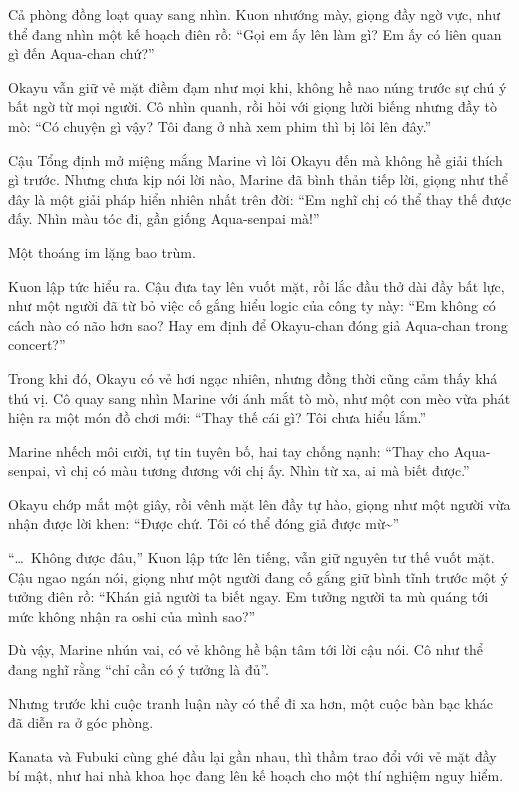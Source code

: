\documentclass[../main.tex]{subfiles}
\begin{document}

Cả phòng đồng loạt quay sang nhìn. Kuon nhướng mày, giọng đầy ngờ vực, như thể đang nhìn một kế hoạch điên rồ: ``Gọi em ấy lên làm gì? Em ấy có liên quan gì đến Aqua-chan chứ?''

Okayu vẫn giữ vẻ mặt điềm đạm như mọi khi, không hề nao núng trước sự chú ý bất ngờ từ mọi người. Cô nhìn quanh, rồi hỏi với giọng lười biếng nhưng đầy tò mò: ``Có chuyện gì vậy? Tôi đang ở nhà xem phim thì bị lôi lên đây.''

Cậu Tổng định mở miệng mắng Marine vì lôi Okayu đến mà không hề giải thích gì trước. Nhưng chưa kịp nói lời nào, Marine đã bình thản tiếp lời, giọng như thể đây là một giải pháp hiển nhiên nhất trên đời: ``Em nghĩ chị có thể thay thế được đấy. Nhìn màu tóc đi, gần giống Aqua-senpai mà!''

Một thoáng im lặng bao trùm.

Kuon lập tức hiểu ra. Cậu đưa tay lên vuốt mặt, rồi lắc đầu thở dài đầy bất lực, như một người đã từ bỏ việc cố gắng hiểu logic của công ty này: ``Em không có cách nào có não hơn sao? Hay em định để Okayu-chan đóng giả Aqua-chan trong concert?''

Trong khi đó, Okayu có vẻ hơi ngạc nhiên, nhưng đồng thời cũng cảm thấy khá thú vị. Cô quay sang nhìn Marine với ánh mắt tò mò, như một con mèo vừa phát hiện ra một món đồ chơi mới: ``Thay thế cái gì? Tôi chưa hiểu lắm.''

Marine nhếch môi cười, tự tin tuyên bố, hai tay chống nạnh: ``Thay cho Aqua-senpai, vì chị có màu tương đương với chị ấy. Nhìn từ xa, ai mà biết được.''

Okayu chớp mắt một giây, rồi vênh mặt lên đầy tự hào, giọng như một người vừa nhận được lời khen: ``Được chứ. Tôi có thể đóng giả được mừ\~{}''

``\dots\ Không được đâu,'' Kuon lập tức lên tiếng, vẫn giữ nguyên tư thế vuốt mặt. Cậu ngao ngán nói, giọng như một người đang cố gắng giữ bình tĩnh trước một ý tưởng điên rồ: ``Khán giả người ta biết ngay. Em tưởng người ta mù quáng tới mức không nhận ra oshi của mình sao?''

Dù vậy, Marine nhún vai, có vẻ không hề bận tâm tới lời cậu nói. Cô như thể đang nghĩ rằng ``chỉ cần có ý tưởng là đủ''.

Nhưng trước khi cuộc tranh luận này có thể đi xa hơn, một cuộc bàn bạc khác đã diễn ra ở góc phòng.

Kanata và Fubuki cùng ghé đầu lại gần nhau, thì thầm trao đổi với vẻ mặt đầy bí mật, như hai nhà khoa học đang lên kế hoạch cho một thí nghiệm nguy hiểm.
\end{document}
